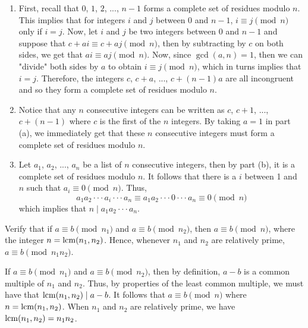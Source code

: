\begin{solution}
    \begin{enumerate}
        \item First, recall that $0$, $1$, $2$, ..., $n-1$ forms a complete set of residues modulo $n$. This implies that for integers $i$ and $j$ between 0 and $n-1$, $i \equiv j \pmod n$ only if $i = j$. Now, let $i$ and $j$ be two integers between 0 and $n-1$ and suppose that $c + ai \equiv c+aj \pmod n$, then by subtracting by $c$ on both sides, we get that $ai \equiv aj \pmod n$. Now, since $\gcd(a,n) = 1$, then we can "divide" both sides by $a$ to obtain $i \equiv j \pmod n$, which in turns implies that $i = j$. Therefore, the integers $c$, $c+a$, ..., $c+(n-1)a$ are all incongruent and so they form a complete set of residues modulo $n$.
        \item Notice that any $n$ consecutive integers can be written as $c$, $c + 1$, ..., $c+(n-1)$ where $c$ is the first of the $n$ integers. By taking $a = 1$ in part (a), we immediately get that these $n$ consecutive integers must form a complete set of residues modulo $n$.
        \item Let $a_1$, $a_2$, ..., $a_n$ be a list of $n$ consecutive integers, then by part (b), it is a complete set of residues modulo $n$. It follows that there is a $i$ between 1 and $n$ such that $a_i \equiv 0 \pmod n$. Thus, 
        $$a_1 a_2 \cdot \cdot \cdot a_i \cdot \cdot \cdot a_n \equiv a_1 a_2 \cdot \cdot \cdot 0 \cdot \cdot \cdot a_n \equiv 0 \pmod n$$
        which implies that $n \mid a_1 a_2 \cdot \cdot \cdot a_n$.
    \end{enumerate}
\end{solution}

\begin{exercise}
    Verify that if $a\equiv b \pmod{n_1}$ and $a \equiv b \pmod{n_2}$, then $a \equiv b \pmod{n}$, where the integer $n = \operatorname{lcm}(n_1, n_2)$. Hence, whenever $n_1$ and $n_2$ are relatively prime, $a \equiv b \pmod{n_1n_2}$. \\
\end{exercise}

\begin{solution}
    If $a\equiv b \pmod{n_1}$ and $a \equiv b \pmod{n_2}$, then by definition, $a - b$ is a common multiple of $n_1$ and $n_2$. Thus, by properties of the least common multiple, we must have that $\operatorname{lcm}(n_1, n_2) \mid a - b$. It follows that $a \equiv b \pmod{n}$ where $n = \operatorname{lcm}(n_1, n_2)$. When $n_1$ and $n_2$ are relatively prime, we have $\operatorname{lcm}(n_1, n_2) = n_1n_2$. \\
\end{solution}

